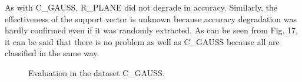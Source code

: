 As with C\_GAUSS, R\_PLANE did not degrade in accuracy. Similarly, the effectiveness of the support vector is unknown because accuracy degradation was hardly confirmed even if it was randomly extracted. As can be seen from Fig. 17, it can be said that there is no problem as well as C\_GAUSS because all are classified in the same way.
\begin{figure}[t]
\begin{center}
\end{center}
\caption{Evaluation in the dataset C\_GAUSS.}
\vspace*{-3pt}
\end{figure}

